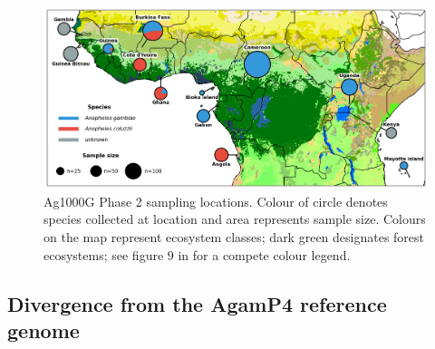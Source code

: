 \documentclass[a4paper,11pt,abstracton,hidelinks]{scrartcl}
\begin{document}
\begin{figure}[H]
	\begin{center}
		\includegraphics*[width=5.8in]{artwork/collection_site_map.jpg}
	\end{center}
	\caption{Ag1000G Phase 2 sampling locations. Colour of circle denotes species collected at location and area represents sample size. Colours on the map represent ecosystem classes; dark green designates forest ecosystems; see figure 9 in \cite{sayre2013} for a compete colour legend.}
	\label{sample_map}
\end{figure}


%


\subsection*{Divergence from the AgamP4 reference genome}
\end{document}
